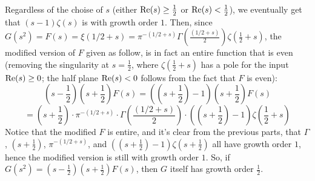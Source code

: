\documentclass{article}
\begin{document}
\begin{itemize}
    \hfil

    Regardless of the choise of $s$ (either $\textmd{Re}(s)\geq \frac{1}{2}$ or $\textmd{Re}(s)<\frac{1}{2}$), we eventually get that $(s-1)\zeta(s)$ is with growth order $1$. Then, since $G(s^2)=F(s)=\xi(1/2+s) = \pi^{-(1/2+s)}\Gamma\left(\frac{(1/2+s)}{2}\right)\zeta(\frac{1}{2}+s)$, the modified version of $F$ given as follow, is in fact an entire function that is even (removing the singularity at $s=\frac{1}{2}$, where $\zeta(\frac{1}{2}+s)$ has a pole for the input $\textmd{Re}(s)\geq 0$; the half plane $\textmd{Re}(s)<0$ follows from the fact that $F$ is even):
    $$\left(s-\frac{1}{2}\right)\left(s+\frac{1}{2}\right)F(s)=\left(\left(s+\frac{1}{2}\right)-1\right)\left(s+\frac{1}{2}\right)F(s)$$
    $$ = \left(s+\frac{1}{2}\right)\cdot \pi^{-(1/2+s)}\cdot \Gamma\left(\frac{(1/2+s)}{2}\right)\cdot \left(\left(s+\frac{1}{2}\right)-1\right)\zeta(\frac{1}{2}+s)$$
    Notice that the modified $F$ is entire, and it's clear from the previous parts, that $\Gamma$, $(s+\frac{1}{2})$, $\pi^{-(1/2+s)}$, and $((s+\frac{1}{2})-1)\zeta(s+\frac{1}{2})$ all have growth order $1$, hence the modified version is still with growth order $1$. So, if $G(s^2)=\left(s-\frac{1}{2}\right)\left(s+\frac{1}{2}\right)F(s)$, then $G$ itself has growth order $\frac{1}{2}$.

    
    \hfil


\end{itemize}
\end{document}
